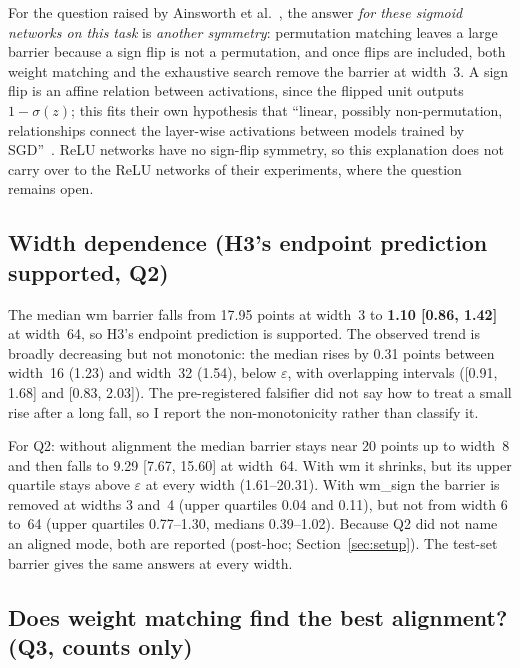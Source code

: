 \documentclass[11pt]{article}
\newcommand{\md}[1]{\textsf{#1}}
\newcommand{\eps}{\varepsilon}
\begin{document}
For the question raised by Ainsworth et al.~\cite[Section~5.3]{ainsworth2023git}, the answer \emph{for these sigmoid networks on this task} is \emph{another symmetry}: permutation matching leaves a large barrier because a sign flip is not a permutation, and once flips are included, both weight matching and the exhaustive search remove the barrier at width~3. A sign flip is an affine relation between activations, since the flipped unit outputs $1-\sigma(z)$; this fits their own hypothesis that ``linear, possibly non-permutation, relationships connect the layer-wise activations between models trained by SGD''~\cite[Section~7]{ainsworth2023git}. ReLU networks have no sign-flip symmetry, so this explanation does not carry over to the ReLU networks of their experiments, where the question remains open.

\subsection{Width dependence (H3's endpoint prediction supported, Q2)}

The median \md{wm} barrier falls from 17.95 points at width~3 to \textbf{1.10 [0.86, 1.42]} at width~64, so H3's endpoint prediction is supported. The observed trend is broadly decreasing but not monotonic: the median rises by 0.31 points between width~16 (1.23) and width~32 (1.54), below $\eps$, with overlapping intervals ([0.91, 1.68] and [0.83, 2.03]). The pre-registered falsifier did not say how to treat a small rise after a long fall, so I report the non-monotonicity rather than classify it.

For Q2: without alignment the median barrier stays near 20 points up to width~8 and then falls to 9.29 [7.67, 15.60] at width~64. With \md{wm} it shrinks, but its upper quartile stays above $\eps$ at every width (1.61--20.31). With \md{wm\_sign} the barrier is removed at widths 3 and~4 (upper quartiles 0.04 and 0.11), but not from width 6 to~64 (upper quartiles 0.77--1.30, medians 0.39--1.02). Because Q2 did not name an aligned mode, both are reported (post-hoc; Section~\ref{sec:setup}). The test-set barrier gives the same answers at every width.

\subsection{Does weight matching find the best alignment? (Q3, counts only)}
\end{document}
